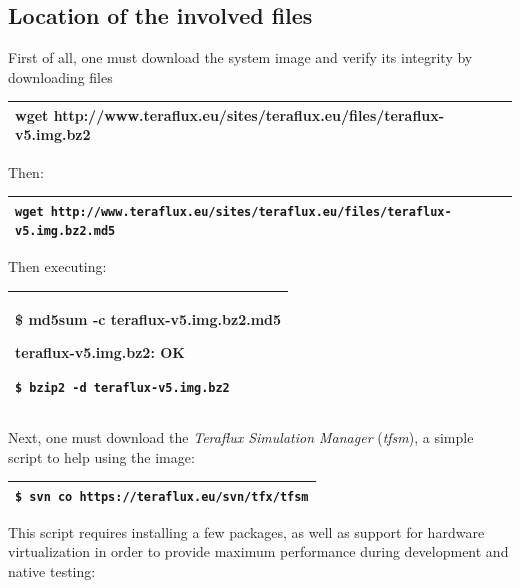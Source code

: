 \documentclass[a4paper]{article}
\begin{document}
\subsection[Location of the involved files]{Location of the involved
files}
{
First of all, one must download the system image and verify its
integrity by downloading files}

\begin{flushleft}
\tablehead{}
\begin{supertabular}{|m{6.22196in}|}
\hline
{}\ttfamily wget
http://www.teraflux.eu/sites/teraflux.eu/files/teraflux-v5.img.bz2\\\hline
\end{supertabular}
\end{flushleft}
{
Then:}

\begin{flushleft}
\tablehead{}
\begin{supertabular}{|m{6.22196in}|}
\hline
{} \texttt{wget
http://www.teraflux.eu/sites/teraflux.eu/files/teraflux-v5.img.bz2.md5}\\\hline
\end{supertabular}
\end{flushleft}
{
Then executing:}

\begin{flushleft}
\tablehead{}
\begin{supertabular}{|m{6.22196in}|}
\hline
{\ttfamily \$ md5sum -c teraflux-v5.img.bz2.md5}

{\ttfamily teraflux-v5.img.bz2: OK}

 \texttt{\$ bzip2 -d
teraflux-v5.img.bz2}\\\hline
\end{supertabular}
\end{flushleft}
{
Next, one must download the \textit{Teraflux Simulation Manager}
(\textit{tfsm}), a simple script to help using the image:}

\begin{flushleft}
\tablehead{}
\begin{supertabular}{|m{6.22196in}|}
\hline
{} \texttt{\$ svn co
}\texttt{https://teraflux.eu/svn/tfx/tfsm}\\\hline
\end{supertabular}
\end{flushleft}
{
This script requires installing a few packages, as well as support for
hardware virtualization in order to provide maximum performance during
development and native testing:}
\end{document}
